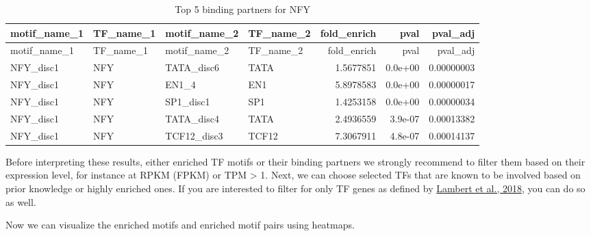 \documentclass[
]{article}
\begin{document}
\begin{longtable}[]{@{}llllrrr@{}}
\caption{Top 5 binding partners for NFY}\tabularnewline
\toprule
motif\_name\_1 & TF\_name\_1 & motif\_name\_2 & TF\_name\_2 &
fold\_enrich & pval & pval\_adj \\
\midrule
\endfirsthead
\toprule
motif\_name\_1 & TF\_name\_1 & motif\_name\_2 & TF\_name\_2 &
fold\_enrich & pval & pval\_adj \\
\midrule
\endhead
NFY\_disc1 & NFY & TATA\_disc6 & TATA & 1.5677851 & 0.0e+00 &
0.00000003 \\
NFY\_disc1 & NFY & EN1\_4 & EN1 & 5.8978583 & 0.0e+00 & 0.00000017 \\
NFY\_disc1 & NFY & SP1\_disc1 & SP1 & 1.4253158 & 0.0e+00 &
0.00000034 \\
NFY\_disc1 & NFY & TATA\_disc4 & TATA & 2.4936559 & 3.9e-07 &
0.00013382 \\
NFY\_disc1 & NFY & TCF12\_disc3 & TCF12 & 7.3067911 & 4.8e-07 &
0.00014137 \\
\bottomrule
\end{longtable}

Before interpreting these results, either enriched TF motifs or their
binding partners we strongly recommend to filter them based on their
expression level, for instance at RPKM (FPKM) or TPM \textgreater{} 1.
Next, we can choose selected TFs that are known to be involved based on
prior knowledge or highly enriched ones. If you are interested to filter
for only TF genes as defined by
\href{https://pubmed.ncbi.nlm.nih.gov/29425488/}{Lambert et al., 2018},
you can do so as well.

Now we can visualize the enriched motifs and enriched motif pairs using
heatmaps.
\end{document}
